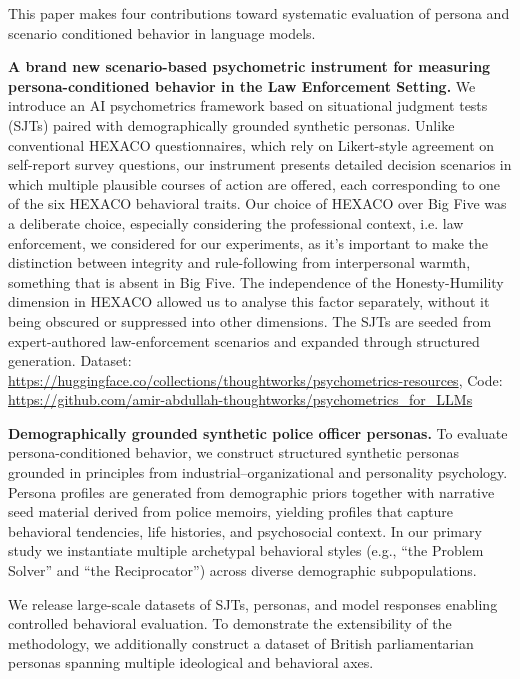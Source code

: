 \documentclass[11pt]{article}
\begin{document}
This paper makes four contributions toward systematic evaluation of persona and scenario conditioned behavior in language models.

\noindent \textbf{A brand new scenario-based psychometric instrument for measuring persona-conditioned behavior in the Law Enforcement Setting.}
We introduce an AI psychometrics framework based on situational judgment tests (SJTs) paired with demographically grounded synthetic personas. Unlike conventional HEXACO questionnaires, which rely on Likert-style agreement on self-report survey questions, our instrument presents detailed decision scenarios in which multiple plausible courses of action are offered, each corresponding to one of the six HEXACO behavioral traits. Our choice of HEXACO over Big Five was a deliberate choice, especially considering the professional context, i.e. law enforcement, we considered for our experiments, as it's important to make the distinction between integrity and rule-following from interpersonal warmth, something that is absent in Big Five. The independence of the Honesty-Humility dimension in HEXACO allowed us to analyse this factor separately, without it being obscured or suppressed into other dimensions. The SJTs are seeded from expert-authored law-enforcement scenarios and expanded through structured generation. Dataset: \url{https://huggingface.co/collections/thoughtworks/psychometrics-resources}, Code: \url{https://github.com/amir-abdullah-thoughtworks/psychometrics_for_LLMs}

\noindent \textbf{Demographically grounded synthetic police officer personas.}
To evaluate persona-conditioned behavior, we construct structured synthetic personas grounded in principles from industrial–organizational and personality psychology. Persona profiles are generated from demographic priors together with narrative seed material derived from police memoirs, yielding profiles that capture behavioral tendencies, life histories, and psychosocial context. In our primary study we instantiate multiple archetypal behavioral styles (e.g., ``the Problem Solver'' and ``the Reciprocator'') \citep{broderick1986police, muir1979police} across diverse demographic subpopulations. 

We release large-scale datasets of SJTs, personas, and model responses enabling controlled behavioral evaluation. To demonstrate the extensibility of the methodology, we additionally construct a dataset of British parliamentarian personas spanning multiple ideological and behavioral axes.
\end{document}
